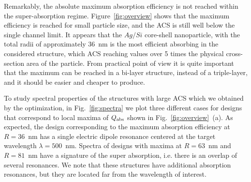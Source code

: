 \documentclass[aps,prl,twocolumn,showpacs,superscriptaddress,groupedaddress]{revtex4-1}
\begin{document}
Remarkably, the absolute maximum absorption efficiency is not reached
within the super-absorption regime. Figure~\ref{fig:overview} shows
that the maximum efficiency is reached for small particle size, and
the ACS is still well below the single channel limit. It appears that
the $Ag/Si$ core-shell nanoparticle, with the total radii of
approximately 36~nm is the most efficient absorbing in the considered
structure, which ACS reaching values over 5 times the physical
cross-section area of the particle.  From practical point of view it
is quite important that the maximum can be reached in a bi-layer
structure, instead of a triple-layer, and it should be easier and
cheaper to produce.

\begin{figure}
\end{figure}
To study spectral properties of the structures with large ACS which we
obtained by the optimization, in Fig.~\ref{fig:spectra} we plot three
different cases for designs that correspond to local maxima of $Q_{\rm
  abs}$ shown in Fig.~\ref{fig:overview}~(a).  As expected, the design
corresponding to the maximum absorption efficiency at $R=36$~nm has a
single electric dipole resonance centered at the target wavelength
$\lambda=500$~nm. Spectra of designs with maxima at $R=63$~nm and
$R=81$~nm have a signature of the super absorption, i.e. there is an
overlap of several resonances.  We note that these structures have
additional absorption resonances, but they are located far from the
wavelength of interest.
\end{document}
